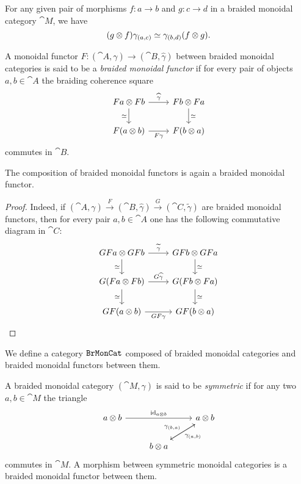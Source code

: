 \documentclass[../../deep-dive]{subfiles}
\begin{document}
\begin{corollary}
\label{cor:braiding-morphisms}
For any given pair of morphisms \(f: a \to b\) and \(g: c \to d\) in a braided
monoidal category \(\cat M\), we have
\[
(g \otimes f) \gamma_{(a, c)} \simeq \gamma_{(b, d)} (f \otimes g).
\]
\end{corollary}

\begin{definition}
\label{def:braided-monoidal-functor}
A monoidal functor \(F: (\cat A, \gamma) \to (\cat B, \widehat \gamma)\) between
braided monoidal categories is said to be a \emph{braided monoidal functor} if
for every pair of objects \(a, b \in \cat A\) the braiding coherence square
\[
\begin{tikzcd}
F a \otimes F b \ar[r, "\widehat\gamma"] \ar[d, "\dis"']
&F b \otimes F a \ar[d, "\dis"] \\
F (a \otimes b) \ar[r, "F \gamma"'] &F (b \otimes a)
\end{tikzcd}
\]
commutes in \(\cat B\).
\end{definition}

\begin{corollary}
\label{cor:composition-of-braided-monoidal-functors}
The composition of braided monoidal functors is again a braided monoidal
functor.
\end{corollary}

\begin{proof}
Indeed, if
\((\cat A, \gamma) \xrightarrow F (\cat B, \widehat \gamma) \xrightarrow G (\cat
C, \widetilde \gamma)\) are braided monoidal functors, then for every pair
\(a, b \in \cat A\) one has the following commutative diagram in \(\cat C\):
\[
\begin{tikzcd}
G F a \otimes G F b
\ar[r, "\widetilde \gamma"]
\ar[d, "\dis"']
&GF b \otimes GF a
\ar[d, "\dis"]
\\
G(F a \otimes F b)
\ar[r, "G \widehat \gamma"]
\ar[d, "\dis"']
&G (F b \otimes F a)
\ar[d, "\dis"]
\\
GF (a \otimes b)
\ar[r, "G F \gamma"']
&GF (b \otimes a)
\end{tikzcd}
\]
\end{proof}

\begin{definition}
\label{def:category-of-braided-monoidal}
We define a category \({\texttt{BrMonCat}}\) composed of braided monoidal categories and
braided monoidal functors between them.
\end{definition}

\begin{definition}
\label{def:symmetric-monoidal-category}
A braided monoidal category \((\cat M, \gamma)\) is said to be \emph{symmetric}
if for any two \(a, b \in \cat M\) the triangle
\[
\begin{tikzcd}
a \otimes b \ar[rr, "\Id_{a \otimes b}"]
& &a \otimes b \ar[ld, "\gamma_{(a, b)}"] \\
&b \otimes a \ar[ru, "\gamma_{(b, a)}"] &
\end{tikzcd}
\]
commutes in \(\cat M\). A morphism between symmetric monoidal categories is a
braided monoidal functor between them.
\end{definition}
\end{document}
